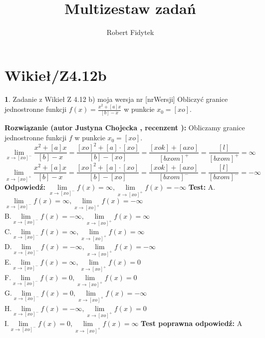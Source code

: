 \documentclass[12pt, a4paper]{article}
\title{Multizestaw zadań}
\author{Robert Fidytek}
\date{}
\theoremstyle{definition} %
\newtheorem{zad}{}
\newcommand{\kategoria}[1]{\section{#1}} %
\newcommand{\zadStart}[1]{\begin{zad}#1\newline} %
\newcommand{\zadStop}{\end{zad}}   %
\newcommand{\rozwStart}[2]{\noindent \textbf{Rozwiązanie (autor #1 , recenzent #2): }\newline} %
\newcommand{\rozwStop}{\newline}                                            %
\newcommand{\odpStart}{\noindent \textbf{Odpowiedź:}\newline}    %
\newcommand{\odpStop}{\newline}                                             %
\newcommand{\testStart}{\noindent \textbf{Test:}\newline} %
\newcommand{\testStop}{\newline} %
\newcommand{\kluczStart}{\noindent \textbf{Test poprawna odpowiedź:}\newline} %
\newcommand{\kluczStop}{\newline} %
\begin{document}
\maketitle


\kategoria{Wikieł/Z4.12b}
\zadStart{Zadanie z Wikieł Z 4.12 b) moja wersja nr [nrWersji]}
Obliczyć granice jednostronne funkcji $f(x)=\frac{x^{2}+[a]x}{[b]-x}$ w punkcie $x_{0}=[xo]$. 
\zadStop
\rozwStart{Justyna Chojecka}{}
Obliczamy granice jednostronne funkcji $f$ w punkcie $x_{0}=[xo]$.
$$\lim\limits_{x\to [xo]^{-}}\frac{x^{2}+[a]x}{[b]-x}=\frac{[xo]^{2}+[a]\cdot [xo]}{[b]-[xo]}=\frac{[xok]+[axo]}{[bxom]^{+}}=\frac{[l]}{[bxom]^{+}}=\infty$$
$$\lim\limits_{x\to [xo]^{+}}\frac{x^{2}+[a]x}{[b]-x}=\frac{[xo]^{2}+[a]\cdot [xo]}{[b]-[xo]}=\frac{[xok]+[axo]}{[bxom]^{-}}=\frac{[l]}{[bxom]^{-}}=-\infty$$
\rozwStop
\odpStart
$\lim\limits_{x\to [xo]^{-}}f(x)=\infty, \lim\limits_{x\to [xo]^{+}}f(x)=-\infty$
\odpStop
\testStart
A.$\lim\limits_{x\to [xo]^{-}}f(x)=\infty, \lim\limits_{x\to [xo]^{+}}f(x)=-\infty$\\
B.$\lim\limits_{x\to [xo]^{-}}f(x)=-\infty, \lim\limits_{x\to [xo]^{+}}f(x)=\infty$\\
C.$\lim\limits_{x\to [xo]^{-}}f(x)=\infty, \lim\limits_{x\to [xo]^{+}}f(x)=\infty$\\
D.$\lim\limits_{x\to [xo]^{-}}f(x)=-\infty, \lim\limits_{x\to [xo]^{+}}f(x)=-\infty$\\
E.$\lim\limits_{x\to [xo]^{-}}f(x)=\infty, \lim\limits_{x\to [xo]^{+}}f(x)=0$\\
F.$\lim\limits_{x\to [xo]^{-}}f(x)=0, \lim\limits_{x\to [xo]^{+}}f(x)=0$\\
G.$\lim\limits_{x\to [xo]^{-}}f(x)=0, \lim\limits_{x\to [xo]^{+}}f(x)=-\infty$\\
H.$\lim\limits_{x\to [xo]^{-}}f(x)=-\infty, \lim\limits_{x\to [xo]^{+}}f(x)=0$\\
I.$\lim\limits_{x\to [xo]^{-}}f(x)=0, \lim\limits_{x\to [xo]^{+}}f(x)=\infty$
\testStop
\kluczStart
A
\kluczStop
\end{document}
